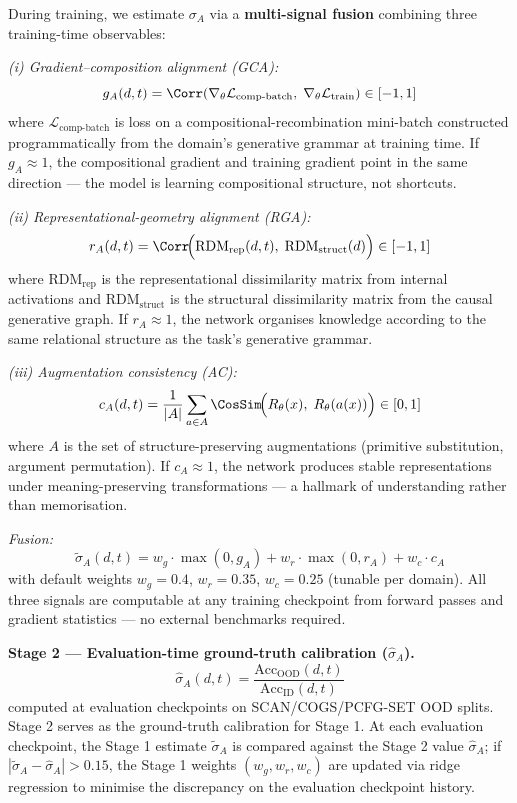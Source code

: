During training, we estimate $\sigma_A$ via a \textbf{multi-signal fusion}
combining three training-time observables:

\textit{(i) Gradient--composition alignment (GCA):}
\begin{equation}\label{eq:gca}
g_A(d,t) = \Corr\!\left(\nabla_{\theta}\mathcal{L}_{\text{comp-batch}},\;\nabla_{\theta}\mathcal{L}_{\text{train}}\right) \in [-1,1]
\end{equation}
where $\mathcal{L}_{\text{comp-batch}}$ is loss on a compositional-recombination
mini-batch constructed programmatically from the domain's generative grammar
at training time.
If $g_A \approx 1$, the compositional gradient and training gradient point
in the same direction --- the model is learning compositional structure,
not shortcuts.

\textit{(ii) Representational-geometry alignment (RGA):}
\begin{equation}\label{eq:rga}
r_A(d,t) = \Corr\!\Big(\text{RDM}_{\text{rep}}(d,t),\;\text{RDM}_{\text{struct}}(d)\Big) \in [-1,1]
\end{equation}
where $\text{RDM}_{\text{rep}}$ is the representational dissimilarity matrix
from internal activations and $\text{RDM}_{\text{struct}}$ is the structural
dissimilarity matrix from the causal generative graph.
If $r_A \approx 1$, the network organises knowledge according to the
same relational structure as the task's generative grammar.

\textit{(iii) Augmentation consistency (AC):}
\begin{equation}\label{eq:ac}
c_A(d,t) = \frac{1}{|A|}\sum_{a \in A} \CosSim\!\Big(R_{\theta}(x),\;R_{\theta}(a(x))\Big) \in [0,1]
\end{equation}
where $A$ is the set of structure-preserving augmentations (primitive
substitution, argument permutation).
If $c_A \approx 1$, the network produces stable representations under
meaning-preserving transformations --- a hallmark of understanding
rather than memorisation.

\textit{Fusion:}
\begin{equation}\label{eq:fusion}
\tilde{\sigma}_A(d,t) = w_g \cdot \max(0, g_A) + w_r \cdot \max(0, r_A) + w_c \cdot c_A
\end{equation}
with default weights $w_g = 0.4$, $w_r = 0.35$, $w_c = 0.25$ (tunable per
domain). All three signals are computable at any training checkpoint from
forward passes and gradient statistics --- no external benchmarks required.

\textbf{Stage 2 --- Evaluation-time ground-truth calibration ($\hat{\sigma}_A$).}
\begin{equation}
\hat{\sigma}_A(d,t) = \frac{\text{Acc}_{\text{OOD}}(d,t)}{\text{Acc}_{\text{ID}}(d,t)}
\label{eq:sgg-proxy}
\end{equation}
computed at evaluation checkpoints on SCAN/COGS/PCFG-SET OOD splits.
Stage 2 serves as the ground-truth calibration for Stage 1. At each
evaluation checkpoint, the Stage 1 estimate $\tilde{\sigma}_A$ is compared
against the Stage 2 value $\hat{\sigma}_A$; if
$|\tilde{\sigma}_A - \hat{\sigma}_A| > 0.15$, the Stage 1 weights
$(w_g, w_r, w_c)$ are updated via ridge regression to minimise the
discrepancy on the evaluation checkpoint history.

